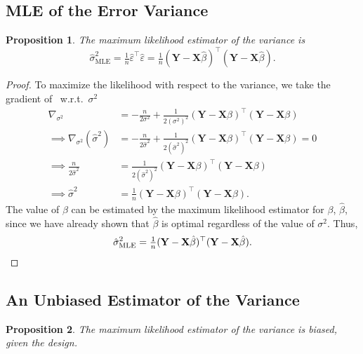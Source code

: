 \documentclass[letterpaper, reqno]{amsart}
\newtheorem{prop}{Proposition}[section]
\numberwithin{equation}{section}
\newcommand{\T}{\top} %
\newcommand{\vect}[1]{\boldsymbol{\mathbf{#1}}} %
\newcommand{\Xm}{\vect{X}}
\newcommand{\Yv}{\vect{Y}}
\newcommand{\Bv}{\beta}
\newcommand{\Bvh}{\hat{\beta}}
\newcommand{\ve}{\varepsilon}
\begin{document}
\subsection{MLE of the Error Variance}
\begin{prop}
  The maximum likelihood estimator of the variance is
  \[ \hat{\sigma}^2_\mathrm{MLE} = \tfrac{1}{n} \hat{\ve}^\T \hat{\ve} 
    = \tfrac{1}{n} (\Yv - \Xm\Bvh)^\T (\Yv - \Xm\Bvh). \]
\end{prop}

\begin{proof}
  To maximize the likelihood with respect to the variance, we take the gradient
  of~ w.r.t.\ $\sigma^2$
  \begin{align*}
    \nabla_{\sigma^2} &= -\frac{n}{2\sigma^2} + \frac{1}{2(\sigma^2)^2}(\Yv - \Xm\Bv)^\T(\Yv - \Xm\Bv) \\
    \implies \nabla_{\sigma^2}(\hat{\sigma}^2) &= -\frac{n}{2\hat{\sigma}^2} 
      + \frac{1}{2(\hat{\sigma}^2)^2}(\Yv - \Xm\Bv)^\T(\Yv - \Xm\Bv) = 0 \\
    \implies \frac{n}{2\hat{\sigma}^2} &= \frac{1}{2(\hat{\sigma}^2)^2}(\Yv - \Xm\Bv)^\T(\Yv - \Xm\Bv) \\
    \implies \hat{\sigma}^2 &= \tfrac{1}{n}(\Yv - \Xm\Bv)^\T(\Yv - \Xm\Bv).
  \end{align*}
  The value of $\Bv$ can be estimated by the maximum likelihood estimator for
  $\Bv$, $\Bvh$, since we have already shown that $\Bvh$ is optimal regardless
  of the value of $\sigma^2$. Thus,
  \[ \hat{\sigma}^2_\mathrm{MLE} = \tfrac{1}{n}(\Yv - \Xm\Bvh)^\T(\Yv - \Xm\Bvh). \qedhere \]
\end{proof}

\subsection{An Unbiased Estimator of the Variance}
\begin{prop}
  The maximum likelihood estimator of the variance is biased, given the design.
\end{prop}
\end{document}
